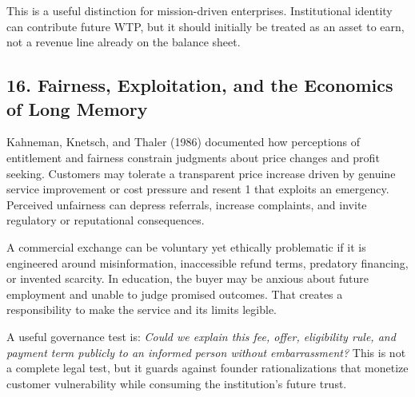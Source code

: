 This is a useful distinction for mission-driven enterprises. Institutional identity can contribute future WTP, but it should initially be treated as an asset to earn, not a revenue line already on the balance sheet.

\subsection*{16. Fairness, Exploitation, and the Economics of Long Memory}

Kahneman, Knetsch, and Thaler (1986) documented how perceptions of entitlement and fairness constrain judgments about price changes and profit seeking. Customers may tolerate a transparent price increase driven by genuine service improvement or cost pressure and resent 1 that exploits an emergency. Perceived unfairness can depress referrals, increase complaints, and invite regulatory or reputational consequences.

A commercial exchange can be voluntary yet ethically problematic if it is engineered around misinformation, inaccessible refund terms, predatory financing, or invented scarcity. In education, the buyer may be anxious about future employment and unable to judge promised outcomes. That creates a responsibility to make the service and its limits legible.

A useful governance test is: \emph{Could we explain this fee, offer, eligibility rule, and payment term publicly to an informed person without embarrassment?} This is not a complete legal test, but it guards against founder rationalizations that monetize customer vulnerability while consuming the institution's future trust.
